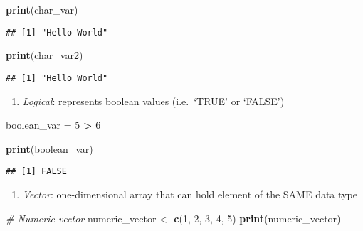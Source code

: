 \documentclass[
]{article}
\newenvironment{Shaded}{\begin{snugshade}}{\end{snugshade}}
\newcommand{\CommentTok}[1]{\textcolor[rgb]{0.56,0.35,0.01}{\textit{#1}}}
\newcommand{\DecValTok}[1]{\textcolor[rgb]{0.00,0.00,0.81}{#1}}
\newcommand{\FunctionTok}[1]{\textcolor[rgb]{0.13,0.29,0.53}{\textbf{#1}}}
\newcommand{\NormalTok}[1]{#1}
\newcommand{\OtherTok}[1]{\textcolor[rgb]{0.56,0.35,0.01}{#1}}
\newcommand{\SpecialCharTok}[1]{\textcolor[rgb]{0.81,0.36,0.00}{\textbf{#1}}}
\providecommand{\tightlist}{%
  \setlength{\itemsep}{0pt}\setlength{\parskip}{0pt}}
\begin{document}
\begin{enumerate}
\begin{Shaded}
\begin{Highlighting}[]
\FunctionTok{print}\NormalTok{(char\_var)}
\end{Highlighting}
\end{Shaded}

\begin{verbatim}
## [1] "Hello World"
\end{verbatim}

\begin{Shaded}
\begin{Highlighting}[]
\FunctionTok{print}\NormalTok{(char\_var2)}
\end{Highlighting}
\end{Shaded}

\begin{verbatim}
## [1] "Hello World"
\end{verbatim}

  \begin{enumerate}
  \def\labelenumii{\arabic{enumii}.}
  \setcounter{enumii}{2}
  \tightlist
  \item
    \emph{Logical}: represents boolean values (i.e.~`TRUE' or `FALSE')
  \end{enumerate}

\begin{Shaded}
\begin{Highlighting}[]
\NormalTok{boolean\_var }\OtherTok{=} \DecValTok{5} \SpecialCharTok{\textgreater{}} \DecValTok{6}

\FunctionTok{print}\NormalTok{(boolean\_var)}
\end{Highlighting}
\end{Shaded}

\begin{verbatim}
## [1] FALSE
\end{verbatim}

  \begin{enumerate}
  \def\labelenumii{\arabic{enumii}.}
  \setcounter{enumii}{3}
  \tightlist
  \item
    \emph{Vector}: one-dimensional array that can hold element of the
    SAME data type
  \end{enumerate}

\begin{Shaded}
\begin{Highlighting}[]
  \CommentTok{\# Numeric vector}
\NormalTok{  numeric\_vector }\OtherTok{\textless{}{-}} \FunctionTok{c}\NormalTok{(}\DecValTok{1}\NormalTok{, }\DecValTok{2}\NormalTok{, }\DecValTok{3}\NormalTok{, }\DecValTok{4}\NormalTok{, }\DecValTok{5}\NormalTok{)}
  \FunctionTok{print}\NormalTok{(numeric\_vector)}
\end{Highlighting}
\end{Shaded}


\end{enumerate}
\end{document}
